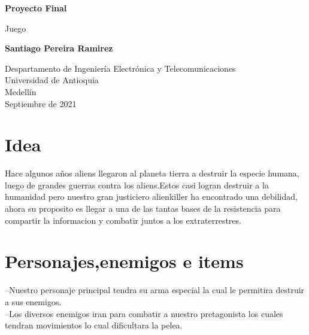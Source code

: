 \documentclass{article}
\begin{document}
\begin{titlepage}
    \begin{center}
        \vspace*{1cm}
            
        \Huge
        \textbf{Proyecto Final}
            
        \vspace{0.5cm}
        \LARGE
        Juego
            
        \vspace{1.5cm}
            
        \textbf{Santiago Pereira Ramirez}
            
        \vfill
            
        \vspace{0.8cm}
            
        \Large
        Despartamento de Ingeniería Electrónica y Telecomunicaciones\\
        Universidad de Antioquia\\
        Medellín\\
        Septiembre de 2021
            
    \end{center}
\end{titlepage}

\tableofcontents
\newpage
\section{Idea}\label{intro}
Hace algunos años aliens llegaron al planeta tierra a destruir la especie humana, luego de grandes guerras contra los aliens.Estos casi logran destruir a la humanidad pero nuestro gran justiciero alienkiller ha encontrado una debilidad, ahora su proposito es llegar a una de las tantas bases de la resistencia para compartir la informacion y combatir juntos a los extraterrestres.

\section{Personajes,enemigos e items} \label{intro}

--Nuestro personaje principal tendra su arma especial la cual le permitira destruir a sus enemigos.\\

--Los diversos enemigos iran para combatir a nuestro pretagonista los cuales tendran movimientos lo cual dificultara la pelea.\\
\end{document}
